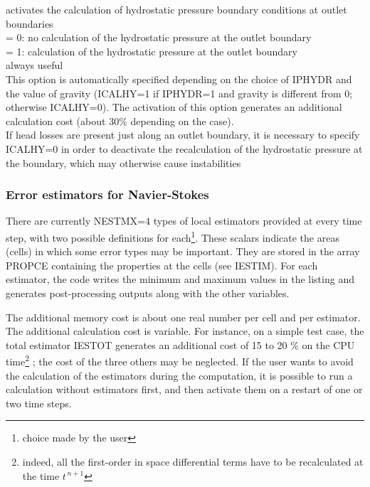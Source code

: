 {activates the calculation of hydrostatic pressure boundary conditions at outlet
boundaries\\
\hspace*{1.3cm}= 0: no calculation of the hydrostatic pressure at the outlet boundary\\
\hspace*{1.3cm}= 1: calculation of the hydrostatic pressure at the outlet boundary\\
always useful\\
This option is automatically specified depending on the
choice of IPHYDR and the value of gravity
(ICALHY=1 if IPHYDR=1 and gravity is different from 0; otherwise
ICALHY=0). The activation of this option generates an additional
calculation cost (about 30\% depending on the case).\\
If head losses are present just along an outlet boundary, it is necessary to
specify ICALHY=0 in order to deactivate the recalculation of the hydrostatic
pressure at the boundary, which may otherwise cause instabilities}



\subsubsection{Error estimators for Navier-Stokes}

There are currently NESTMX=4 types of local estimators
provided at every time step, with two possible definitions for
each\footnote{choice made by the user}. These scalars indicate the areas
(cells) in which some error types may be important. They are
stored in the array PROPCE containing the properties at the cells (see
IESTIM). For each estimator, the code writes the minimum and
maximum values in the listing and generates post-processing outputs along with
the other variables.

The additional memory cost is about one real number per cell and per
estimator. The additional calculation cost is variable. For instance, on a
simple test case, the total estimator IESTOT generates an additional cost
of 15 to 20 $\%$ on the CPU time\footnote{indeed, all the first-order in
space differential terms have to be recalculated at the time $t^{\,n+1}$} ;
the cost of the three others may be neglected. If the user wants to
avoid the calculation of the estimators during the computation, it is
possible to run a calculation without estimators first, and then activate them on
a restart of one or two time steps.

